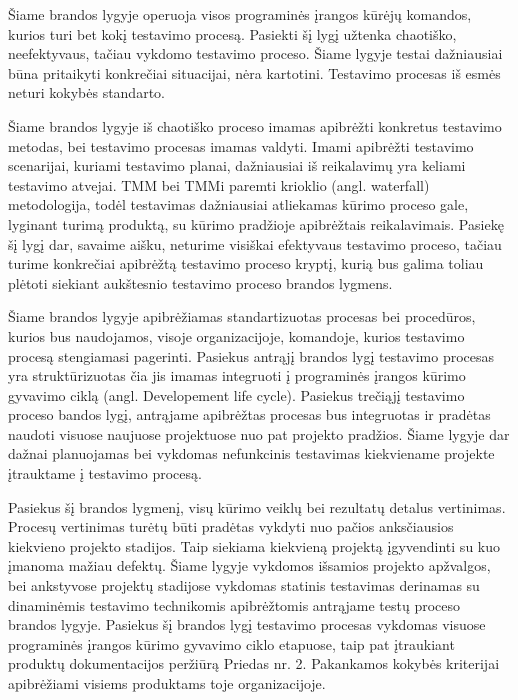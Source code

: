\documentclass{VUMIFPSkursinis}
\begin{document}
Šiame brandos lygyje operuoja visos programinės įrangos kūrėjų komandos, kurios turi bet kokį testavimo procesą. Pasiekti šį lygį užtenka chaotiško, neefektyvaus, tačiau vykdomo testavimo proceso. Šiame lygyje testai dažniausiai būna pritaikyti konkrečiai situacijai, nėra kartotini. Testavimo procesas iš esmės neturi kokybės standarto.

Šiame brandos lygyje iš chaotiško proceso imamas apibrėžti konkretus testavimo metodas, bei testavimo procesas imamas valdyti. Imami apibrėžti testavimo scenarijai, kuriami testavimo planai, dažniausiai iš reikalavimų yra keliami testavimo atvejai. TMM bei TMMi paremti krioklio (angl. waterfall) metodologija, todėl testavimas dažniausiai atliekamas kūrimo proceso gale, lyginant turimą produktą, su kūrimo pradžioje apibrėžtais reikalavimais. Pasiekę šį lygį dar, savaime aišku, neturime visiškai efektyvaus testavimo proceso, tačiau turime konkrečiai apibrėžtą testavimo proceso kryptį, kurią bus galima toliau plėtoti siekiant aukštesnio testavimo proceso brandos lygmens.

Šiame brandos lygyje apibrėžiamas standartizuotas procesas bei procedūros, kurios bus naudojamos, visoje organizacijoje, komandoje, kurios testavimo procesą stengiamasi pagerinti. Pasiekus antrąjį brandos lygį testavimo procesas yra struktūrizuotas čia jis imamas integruoti į programinės įrangos kūrimo gyvavimo ciklą (angl. Developement life cycle). Pasiekus trečiąjį testavimo proceso bandos lygį, antrąjame apibrėžtas procesas bus integruotas ir pradėtas naudoti visuose naujuose projektuose nuo pat projekto pradžios. Šiame lygyje dar dažnai planuojamas bei vykdomas nefunkcinis testavimas kiekviename projekte įtrauktame į testavimo procesą.

Pasiekus šį brandos lygmenį, visų kūrimo veiklų bei rezultatų detalus vertinimas. Procesų vertinimas turėtų būti pradėtas vykdyti nuo pačios anksčiausios kiekvieno projekto stadijos. Taip siekiama kiekvieną projektą įgyvendinti su kuo įmanoma mažiau defektų. Šiame lygyje vykdomos išsamios projekto apžvalgos, bei ankstyvose projektų stadijose vykdomas statinis testavimas derinamas su dinaminėmis testavimo technikomis apibrėžtomis antrąjame testų proceso brandos lygyje. Pasiekus šį brandos lygį testavimo procesas vykdomas visuose programinės įrangos kūrimo gyvavimo ciklo etapuose, taip pat įtraukiant produktų dokumentacijos peržiūrą Priedas nr. 2. Pakankamos kokybės kriterijai apibrėžiami visiems produktams toje organizacijoje.
\end{document}
